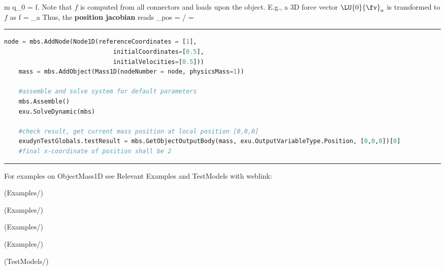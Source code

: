     \be 
      m \cdot \ddot q_0 = f.
    \ee
    Note that $f$ is computed from all connectors and loads upon the object. E.g., a 3D force vector $\LU{0}{\fv}_a$ is 
    transformed to $f$ as
    \be
      f =   _a
    \ee
    Thus, the {\bf position jacobian} reads 
    \be
      \Jm_{pos} = \partial \pv\cCur / \cCur = 
        
    \ee
\vspace{6pt}\par\noindent\rule{\textwidth}{0.4pt}
\label{miniExample_ObjectMass1D}
\pythonstyle
\begin{lstlisting}[language=Python, firstnumber=1]
    node = mbs.AddNode(Node1D(referenceCoordinates = [1], 
                              initialCoordinates=[0.5],
                              initialVelocities=[0.5]))
    mass = mbs.AddObject(Mass1D(nodeNumber = node, physicsMass=1))

    #assemble and solve system for default parameters
    mbs.Assemble()
    exu.SolveDynamic(mbs)

    #check result, get current mass position at local position [0,0,0]
    exudynTestGlobals.testResult = mbs.GetObjectOutputBody(mass, exu.OutputVariableType.Position, [0,0,0])[0]
    #final x-coordinate of position shall be 2
\end{lstlisting}

\vspace{6pt}\par\noindent\rule{\textwidth}{0.4pt}
%
\noindent For examples on ObjectMass1D see Relevant Examples and TestModels with weblink:
\bi
\item {} (Examples/)
\item {} (Examples/)
\item {} (Examples/)
\item {} (Examples/)
\item {} (TestModels/)

